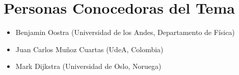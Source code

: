 \documentclass[12pt]{article}
\begin{document}
\section{Personas Conocedoras del Tema}


\begin{itemize}
	\item Benjamin Oostra (Universidad de los Andes, Departamento de F\'isica)
	\item Juan Carlos Mu\~noz Cuartas (UdeA, Colombia)
	\item Mark Dijkstra (Universidad de Oslo, Noruega)
\end{itemize}
\end{document}
